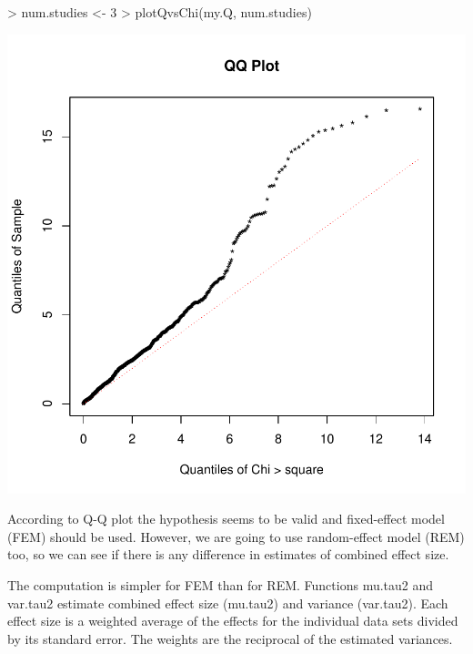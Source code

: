 \documentclass[a4paper]{report}
\begin{document}
\begin{center}
\begin{Schunk}
\begin{Sinput}
> num.studies <- 3
> plotQvsChi(my.Q, num.studies)
\end{Sinput}
\end{Schunk}
\includegraphics{MAMA_full-015}
\end{center}
According to Q-Q plot the hypothesis seems to be valid and fixed-effect model (FEM) should be used. However, we are going to use random-effect model (REM) too, so we can see if there is any difference in estimates of combined effect size.\par  
The computation is simpler for FEM than for REM. Functions {\ttfamily mu.tau2} and {\ttfamily var.tau2} estimate combined effect size ({\ttfamily mu.tau2}) and variance ({\ttfamily var.tau2}). Each effect size is a weighted average of the effects for the individual data sets divided by its standard error. The weights are the reciprocal of the estimated variances.  
\end{document}
